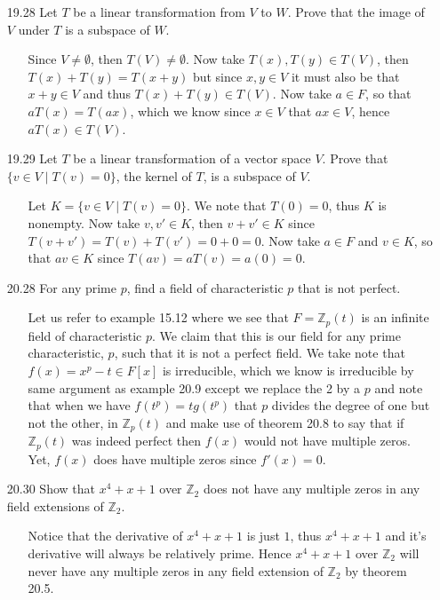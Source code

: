 \documentclass[12pt]{article}
\begin{document}
\begin{enumerate}
\item[19.28] Let $T$ be a linear transformation from $V$ to $W$. Prove that the image of $V$ under $T$ is a subspace of $W$.
\begin{enumerate}
\item[] Since $V \neq \emptyset$, then $T(V) \neq \emptyset$. Now take $T(x), T(y) \in T(V)$, then $T(x) +T(y) = T(x+y)$ but since $x, y \in V$ it must also be that $x+y \in V$ and thus $T(x)+T(y) \in T(V)$. Now take $a \in F$, so that $aT(x) = T(ax)$, which we know since $x \in V$ that $ax \in V$, hence $aT(x) \in T(V)$.
\end{enumerate}

\item[19.29] Let $T$ be a linear transformation of a vector space $V$. Prove that $\{ v \in V \mid T(v) = 0\}$, the kernel of $T$, is a subspace of $V$.
\begin{enumerate}
\item[] Let $K = \{ v \in V \mid T(v) = 0\}$. We note that $T(0) = 0$, thus $K$ is nonempty. Now take $v, v' \in K$, then $v + v' \in K$ since $T(v + v') = T(v) +T(v') = 0 + 0 = 0$. Now take $a \in F$ and $v \in K$, so that $av \in K$ since $T(av) = aT(v) = a(0) = 0$.
\end{enumerate}

\item[20.28] For any prime $p$, find a field of characteristic $p$ that is not perfect.
\begin{enumerate}
\item[] Let us refer to example 15.12 where we see that $F = \mathbb{Z}_p(t)$ is an infinite
field of characteristic $p$. We claim that this is our field for any prime characteristic,
$p$, such that it is not a perfect field. We take note that $f(x) = x^p - t \in F[x]$ is irreducible,
which we know is irreducible by same argument as example 20.9 except we replace the 2 by a $p$ and
note that when we have $f(t^p) = tg(t^p)$ that $p$ divides the degree of one but not the other, in 
$\mathbb{Z}_p(t)$ and make use of theorem 20.8 to say that if $\mathbb{Z}_p(t)$ was indeed perfect
then $f(x)$ would not have multiple zeros. Yet, $f(x)$ does have multiple zeros 
since $f'(x) = 0$.
\end{enumerate}

\item[20.30] Show that $x^4 + x + 1$ over $\mathbb{Z}_2$ does not have any multiple zeros in
any field extensions of $\mathbb{Z}_2$.
\begin{enumerate}
\item[] Notice that the derivative of $x^4 + x + 1$ is just $1$, thus $x^4 + x + 1$ and it's
derivative will always be relatively prime. Hence $x^4 + x + 1$ over $\mathbb{Z}_2$ will never
have any multiple zeros in any field extension of $\mathbb{Z}_2$ by theorem 20.5.
\end{enumerate}


\end{enumerate}
\end{document}
